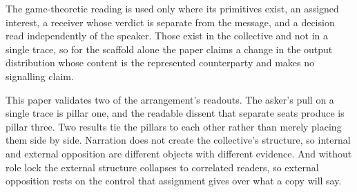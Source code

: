 The game-theoretic reading is used only where its primitives exist, an
assigned interest, a receiver whose verdict is separate from the message,
and a decision read independently of the speaker. Those exist in the
collective and not in a single trace, so for the scaffold alone the paper
claims a change in the output distribution whose content is the
represented counterparty and makes no signalling claim.


This paper validates two of the arrangement's readouts. The asker's pull
on a single trace is pillar one, and the readable dissent that separate
seats produce is pillar three. Two results tie the pillars to each other
rather than merely placing them side by side. Narration does not create
the collective's structure, so internal and external opposition are
different objects with different evidence. And without role lock the
external structure collapses to correlated readers, so external opposition
rests on the control that assignment gives over what a copy will say.
